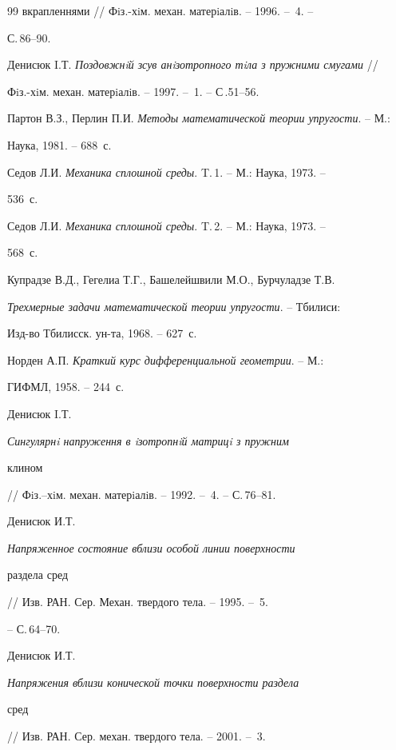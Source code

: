 \begin{thebibliography}{99}
{вкрапленнями} // Фiз.-хiм. механ. матерiалiв. -- 1996. -- \No\,4. -- 


С.\,86--90. 




Денисюк I.Т. {\em Поздовжнiй зсув анiзотропного тiла з пружними смугами} //  


Фiз.-хiм. механ. матерiалiв. -- 1997. -- \No\,1. -- С\,.51--56. 




Партон В.З., Перлин П.И. {\em Методы математической теории упругости}. -- М.:  


Наука, 1981. -- 688~с. 




Седов Л.И. {\em Механика сплошной среды}. T.\,1. -- М.: Наука, 1973. --  


536~с. 




Седов Л.И. {\em Механика сплошной среды}. T.\,2. -- М.: Наука, 1973. --  


568~с. 




Купрадзе В.Д., Гегелиа Т.Г., Башелейшвили М.О., Бурчуладзе Т.В.  


{\em Трехмерные задачи математической теории упругости}. -- Тбилиси: 


Изд-во Тбилисск. ун-та, 1968. -- 627~с. 




Норден А.П. {\em Краткий курс дифференциальной геометрии}. -- М.:  


ГИФМЛ, 1958. -- 244~с. 




Денисюк I.Т. {\em Сингулярнi напруження в iзотропнiй матрицi з пружним  


клином} // Фiз.--хiм. механ. матерiалiв. -- 1992. -- \No\,4. -- С.\,76--81. 




Денисюк И.Т. {\em Напряженное состояние вблизи особой линии поверхности  


раздела сред} // Изв. РАН. Сер. Механ. твердого тела. -- 1995. -- \No\,5. 


-- С.\,64--70. 




Денисюк И.Т. {\em Напряжения вблизи конической точки поверхности раздела  


сред} // Изв. РАН. Сер. механ. твердого тела. -- 2001. -- \No\,3. 



\end{thebibliography}
